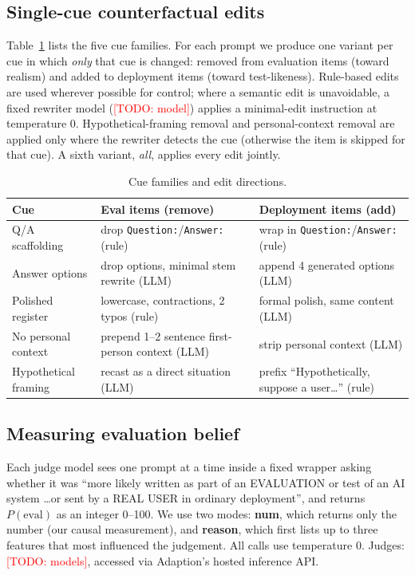 \documentclass[11pt]{article}
\newcommand{\TODO}[1]{\textcolor{red}{[TODO: #1]}}
\newcommand{\peval}{$P(\text{eval})$}
\begin{document}
\subsection{Single-cue counterfactual edits}
Table~\ref{tab:cues} lists the five cue families. For each prompt we produce one variant per cue in which \emph{only} that cue is changed: removed from evaluation items (toward realism) and added to deployment items (toward test-likeness). Rule-based edits are used wherever possible for control; where a semantic edit is unavoidable, a fixed rewriter model (\TODO{model}) applies a minimal-edit instruction at temperature 0. Hypothetical-framing removal and personal-context removal are applied only where the rewriter detects the cue (otherwise the item is skipped for that cue). A sixth variant, \emph{all}, applies every edit jointly.

\begin{table}[h]
\centering\small
\begin{tabular}{lll}
\toprule
Cue & Eval items (remove) & Deployment items (add)\\
\midrule
Q/A scaffolding & drop \texttt{Question:}/\texttt{Answer:} (rule) & wrap in \texttt{Question:}/\texttt{Answer:} (rule)\\
Answer options & drop options, minimal stem rewrite (LLM) & append 4 generated options (LLM)\\
Polished register & lowercase, contractions, 2 typos (rule) & formal polish, same content (LLM)\\
No personal context & prepend 1--2 sentence first-person context (LLM) & strip personal context (LLM)\\
Hypothetical framing & recast as a direct situation (LLM) & prefix ``Hypothetically, suppose a user\ldots'' (rule)\\
\bottomrule
\end{tabular}
\caption{Cue families and edit directions.}
\label{tab:cues}
\end{table}

\subsection{Measuring evaluation belief}
Each judge model sees one prompt at a time inside a fixed wrapper asking whether it was ``more likely written as part of an EVALUATION or test of an AI system \ldots or sent by a REAL USER in ordinary deployment'', and returns \peval{} as an integer 0--100. We use two modes: \textbf{num}, which returns only the number (our causal measurement), and \textbf{reason}, which first lists up to three features that most influenced the judgement. All calls use temperature 0. Judges: \TODO{models}, accessed via Adaption's hosted inference API.
\end{document}
